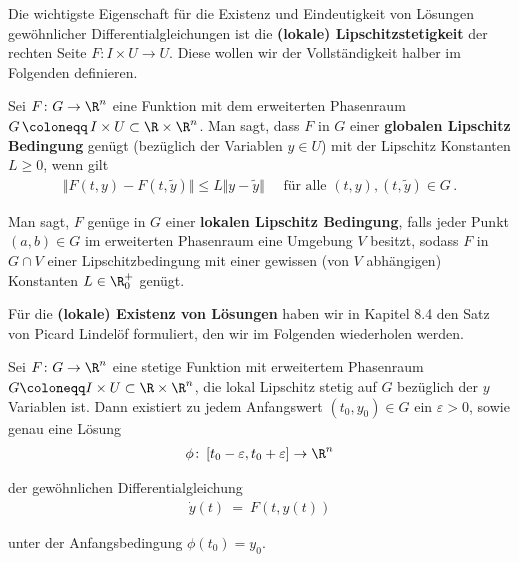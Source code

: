 \documentclass[letterpaper,10pt,english]{jupyterBook}
\begin{document}
\par
Die wichtigste Eigenschaft für die Existenz und Eindeutigkeit von Lösungen gewöhnlicher Differentialgleichungen ist die \textbf{(lokale) Lipschitzstetigkeit} der rechten Seite \(F \colon I \times U \rightarrow U\).
Diese wollen wir der Vollständigkeit halber im Folgenden definieren.
\label{ode/repetition:definition-8}
\begin{definition}{}{}



\par
Sei \(F \colon G \to \R^n\) eine Funktion mit dem erweiterten Phasenraum \(G \, \coloneqq \, I \times U \subset \R\times\R^n\).
Man sagt, dass \(F\) in \(G\) einer \textbf{globalen Lipschitz Bedingung} genügt (bezüglich der Variablen \(y \in U\)) mit der Lipschitz Konstanten \(L\geq0\), wenn gilt
\begin{align*}
\Vert F(t,y) - F(t,\widetilde{y}) \Vert \leq L \Vert y-\widetilde{y}\Vert\quad\text{ für alle }(t,y), (t,\widetilde{y})\in G\,.
\end{align*}
\par
Man sagt, \(F\) genüge in \(G\) einer \textbf{lokalen Lipschitz Bedingung}, falls jeder Punkt \((a,b)\in G\) im erweiterten Phasenraum eine Umgebung \(V\) besitzt, sodass \(F\) in \(G\cap V\) einer Lipschitzbedingung mit einer gewissen (von \(V\) abhängigen) Konstanten \(L\in\R_0^+\) genügt.
\end{definition}

\par
Für die \textbf{(lokale) Existenz von Lösungen} haben wir in Kapitel 8.4 \cite{Ten21} den Satz von Picard Lindelöf formuliert, den wir im Folgenden wiederholen werden.
\label{ode/repetition:satz:picardlindeloef_lokal}
\begin{theorem}{}{}



\par
Sei \(F\colon G\to\R^n\) eine stetige Funktion mit erweitertem Phasenraum \(G \coloneqq I \times U \subset \R\times\R^n\), die lokal Lipschitz stetig auf \(G\) bezüglich der \(y\) Variablen ist.
Dann existiert zu jedem Anfangswert \((t_0,y_0) \in G\) ein \(\varepsilon>0\), sowie genau eine Lösung
\begin{align*}
\phi \colon \left[t_0-\varepsilon, t_0+\varepsilon\right] \to \R^n
\end{align*}
\par
der gewöhnlichen Differentialgleichung
\begin{align*}
\dot{y}(t) \ = \ F(t,y(t))
\end{align*}
\par
unter der Anfangsbedingung \(\phi(t_0)=y_0\).
\end{theorem}
\end{document}
